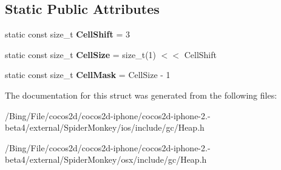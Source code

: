 \subsection*{Static Public Attributes}
\begin{DoxyCompactItemize}
\item 
\hypertarget{structjs_1_1gc_1_1_cell_aa9f8fce837dd9a35296fd04c51a5d7bb}{static const size\-\_\-t {\bfseries Cell\-Shift} = 3}\label{structjs_1_1gc_1_1_cell_aa9f8fce837dd9a35296fd04c51a5d7bb}

\item 
\hypertarget{structjs_1_1gc_1_1_cell_a7eb86016e0a7edfc7e8b2ac98f202796}{static const size\-\_\-t {\bfseries Cell\-Size} = size\-\_\-t(1) $<$$<$ Cell\-Shift}\label{structjs_1_1gc_1_1_cell_a7eb86016e0a7edfc7e8b2ac98f202796}

\item 
\hypertarget{structjs_1_1gc_1_1_cell_a93ec3f94072035cae4aa20489417a441}{static const size\-\_\-t {\bfseries Cell\-Mask} = Cell\-Size -\/ 1}\label{structjs_1_1gc_1_1_cell_a93ec3f94072035cae4aa20489417a441}

\end{DoxyCompactItemize}


The documentation for this struct was generated from the following files\-:\begin{DoxyCompactItemize}
\item 
/\-Bing/\-File/cocos2d/cocos2d-\/iphone/cocos2d-\/iphone-\/2.-\/beta4/external/\-Spider\-Monkey/ios/include/gc/Heap.\-h\item 
/\-Bing/\-File/cocos2d/cocos2d-\/iphone/cocos2d-\/iphone-\/2.-\/beta4/external/\-Spider\-Monkey/osx/include/gc/Heap.\-h\end{DoxyCompactItemize}
